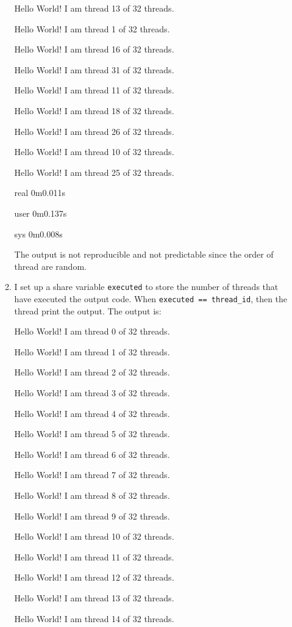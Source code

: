 \documentclass{article}
\begin{document}
\begin{enumerate}
\begin{enumerate}
Hello World! I am thread 13 of 32 threads.

Hello World! I am thread 1 of 32 threads.

Hello World! I am thread 16 of 32 threads.

Hello World! I am thread 31 of 32 threads.

Hello World! I am thread 11 of 32 threads.

Hello World! I am thread 18 of 32 threads.

Hello World! I am thread 26 of 32 threads.

Hello World! I am thread 10 of 32 threads.

Hello World! I am thread 25 of 32 threads.

real	0m0.011s

user	0m0.137s

sys	0m0.008s

The output is not reproducible and not predictable since the order of thread are random.

\item

I set up a share variable \texttt{executed} to store the number of threads that have executed the output code. When \texttt{executed == thread\_id}, then the thread print the output. The output is:

Hello World! I am thread 0 of 32 threads.

Hello World! I am thread 1 of 32 threads.

Hello World! I am thread 2 of 32 threads.

Hello World! I am thread 3 of 32 threads.

Hello World! I am thread 4 of 32 threads.

Hello World! I am thread 5 of 32 threads.

Hello World! I am thread 6 of 32 threads.

Hello World! I am thread 7 of 32 threads.

Hello World! I am thread 8 of 32 threads.

Hello World! I am thread 9 of 32 threads.

Hello World! I am thread 10 of 32 threads.

Hello World! I am thread 11 of 32 threads.

Hello World! I am thread 12 of 32 threads.

Hello World! I am thread 13 of 32 threads.

Hello World! I am thread 14 of 32 threads.


\end{enumerate}
\end{enumerate}
\end{document}
